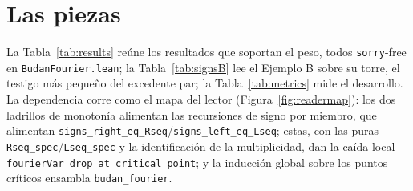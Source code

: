 \documentclass[11pt]{article}
\newcommand{\lean}[1]{\texttt{#1}}
\begin{document}
\section{Las piezas}\label{sec:blocks}

La Tabla~\ref{tab:results} re\'une los resultados que soportan el peso, todos \lean{sorry}-free en
\lean{BudanFourier.lean}; la Tabla~\ref{tab:signsB} lee el Ejemplo B sobre su torre, el testigo m\'as
peque\~no del excedente par; la Tabla~\ref{tab:metrics} mide el desarrollo. La dependencia corre como el
mapa del lector (Figura~\ref{fig:readermap}): los dos ladrillos de monoton\'ia alimentan las
recursiones de signo por miembro, que alimentan \lean{signs\_right\_eq\_Rseq}/\lean{signs\_left\_eq\_Lseq};
estas, con las puras \lean{Rseq\_spec}/\lean{Lseq\_spec} y la identificaci\'on de la multiplicidad, dan
la ca\'ida local \lean{fourierVar\_drop\_at\_critical\_point}; y la inducci\'on global sobre los puntos
cr\'iticos ensambla \lean{budan\_fourier}.
\end{document}
